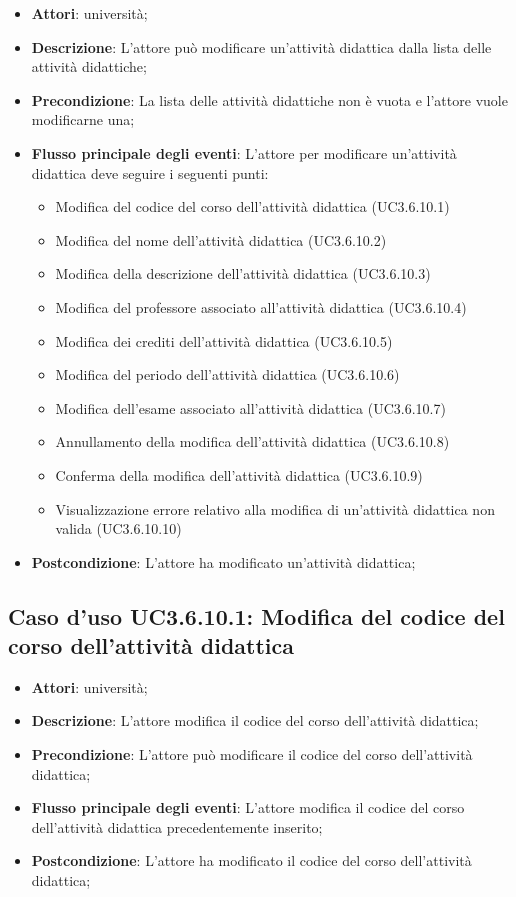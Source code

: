 \begin{itemize}
\item \textbf{Attori}: università;
\item \textbf{Descrizione}: L'attore può modificare un’attività didattica dalla lista delle attività didattiche;

\item \textbf{Precondizione}: La lista delle attività didattiche non è vuota e l'attore vuole modificarne una;

\item \textbf{Flusso principale degli eventi}: L'attore per modificare un’attività didattica deve seguire i seguenti punti:

\begin{itemize}
\item Modifica del codice del corso dell’attività didattica (UC3.6.10.1)
\item Modifica del nome dell’attività didattica (UC3.6.10.2)
\item Modifica della descrizione dell’attività didattica (UC3.6.10.3)
\item Modifica del professore associato all’attività didattica (UC3.6.10.4)
\item Modifica dei crediti dell’attività didattica (UC3.6.10.5)
\item Modifica del periodo dell’attività didattica (UC3.6.10.6)
\item Modifica dell’esame associato all’attività didattica (UC3.6.10.7)
\item Annullamento della modifica dell’attività didattica (UC3.6.10.8)
\item Conferma della modifica dell’attività didattica (UC3.6.10.9)
\item Visualizzazione errore relativo alla modifica di un’attività didattica non valida (UC3.6.10.10)
\end{itemize}
\item \textbf{Postcondizione}: L'attore ha modificato un’attività didattica;

\end{itemize}
\subsection{Caso d'uso \texorpdfstring{UC3.6.10.1}{UC3.6.10.1}: Modifica del codice del corso dell’attività didattica}
\begin{itemize}
\item \textbf{Attori}: università;
\item \textbf{Descrizione}: L'attore modifica il codice del corso dell’attività didattica;

\item \textbf{Precondizione}: L'attore può modificare il codice del corso dell’attività didattica;

\item \textbf{Flusso principale degli eventi}: L'attore modifica il codice del corso dell’attività didattica precedentemente inserito;

\item \textbf{Postcondizione}: L'attore ha modificato il codice del corso dell’attività didattica;

\end{itemize}
